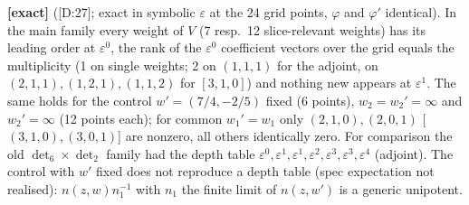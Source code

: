 \documentclass[10pt]{article}
\newcommand{\cl}[2]{\textsf{[#1:#2]}}
\newcommand{\tg}[1]{\textbf{[#1]}}
\begin{document}
\tg{exact} (\cl{D}{27}; exact in symbolic $\varepsilon$ at the 24 grid points, $\varphi$ and $\varphi'$ identical). In the main family every weight of $V$ (7 resp.\ 12 slice-relevant weights) has its leading order at $\varepsilon^0$, the rank of the $\varepsilon^0$ coefficient vectors over the grid equals the multiplicity (1 on single weights; 2 on $(1,1,1)$ for the adjoint, on $(2,1,1),(1,2,1),(1,1,2)$ for $[3,1,0]$) and nothing new appears at $\varepsilon^1$. The same holds for the control $w'=(7/4,-2/5)$ fixed (6 points), $w_2=w_2'=\infty$ and $w_2'=\infty$ (12 points each); for common $w_1'=w_1$ only $(2,1,0),(2,0,1)$ [$(3,1,0),(3,0,1)$] are nonzero, all others identically zero. For comparison the old $\det_6\times\det_2$ family had the depth table $\varepsilon^0,\varepsilon^1,\varepsilon^1,\varepsilon^2,\varepsilon^3,\varepsilon^3,\varepsilon^4$ (adjoint). The control with $w'$ fixed does not reproduce a depth table (spec expectation not realised): $n(z,w)n_1^{-1}$ with $n_1$ the finite limit of $n(z,w')$ is a generic unipotent.
\end{document}
